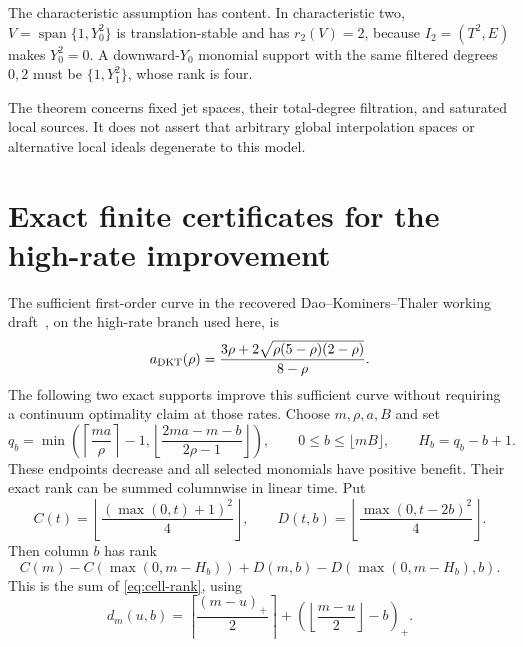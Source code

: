 \documentclass[11pt]{article}
\theoremstyle{remark}\newtheorem{remark}[theorem]{Remark}
\newcommand{\Span}{\operatorname{span}}
\begin{document}
The characteristic assumption has content. In characteristic two, $V=\Span\{1,Y_0^2\}$ is translation-stable and has $r_2(V)=2$, because $I_2=(T^2,E)$ makes $Y_0^2=0$. A downward-$Y_0$ monomial support with the same filtered degrees $0,2$ must be $\{1,Y_1^2\}$, whose rank is four.

The theorem concerns fixed jet spaces, their total-degree filtration, and saturated local sources. It does not assert that arbitrary global interpolation spaces or alternative local ideals degenerate to this model.





\section{Exact finite certificates for the high-rate improvement}\label{sec:certificates}

The sufficient first-order curve in the recovered Dao--Kominers--Thaler
working draft~\cite{DKT}, on the high-rate branch used here, is
\begin{equation}\label{eq:dkt}
 a_{\rm DKT}(\rho)=
 \frac{3\rho+2\sqrt{\rho(5-\rho)(2-\rho)}}{8-\rho}.
\end{equation}
The following two exact supports improve this sufficient curve without
requiring a continuum optimality claim at those rates. Choose $m,\rho,a,B$ and set
\[
 q_b=\min\left(\left\lceil\frac{ma}{\rho}\right\rceil-1,
           \left\lfloor\frac{2ma-m-b}{2\rho-1}\right\rfloor\right),
 \qquad 0\le b\le\lfloor mB\rfloor,
 \qquad H_b=q_b-b+1.
\]
These endpoints decrease and all selected monomials have positive benefit. Their exact rank can be summed columnwise in linear time. Put
\[
 C(t)=\left\lfloor\frac{(\max(0,t)+1)^2}{4}\right\rfloor,
 \qquad D(t,b)=\left\lfloor\frac{\max(0,t-2b)^2}{4}\right\rfloor.
\]
Then column $b$ has rank
\[
 C(m)-C(\max(0,m-H_b))+D(m,b)-D(\max(0,m-H_b),b).
\]
This is the sum of \eqref{eq:cell-rank}, using
\[
 d_m(u,b)=\left\lceil\frac{(m-u)_+}{2}\right\rceil
       +\left(\left\lfloor\frac{m-u}{2}\right\rfloor-b\right)_+.
\]
\end{document}

